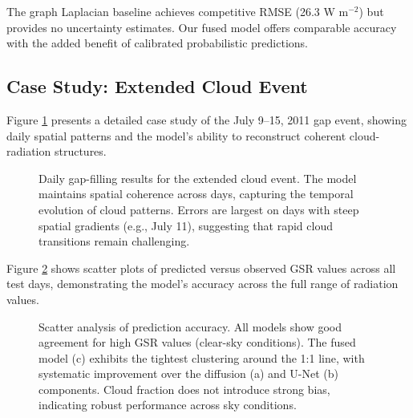 \documentclass[preprint,12pt]{elsarticle}
\begin{document}
The graph Laplacian baseline achieves competitive RMSE (26.3 W m$^{-2}$) but provides no uncertainty estimates. Our fused model offers comparable accuracy with the added benefit of calibrated probabilistic predictions.

\subsection{Case Study: Extended Cloud Event}

Figure \ref{fig:case_study} presents a detailed case study of the July 9--15, 2011 gap event, showing daily spatial patterns and the model's ability to reconstruct coherent cloud-radiation structures.

\begin{figure}[htbp]
\centering
{}
\caption{Daily gap-filling results for the extended cloud event. The model maintains spatial coherence across days, capturing the temporal evolution of cloud patterns. Errors are largest on days with steep spatial gradients (e.g., July 11), suggesting that rapid cloud transitions remain challenging.}
\label{fig:case_study}
\end{figure}

Figure \ref{fig:scatter} shows scatter plots of predicted versus observed GSR values across all test days, demonstrating the model's accuracy across the full range of radiation values.

\begin{figure}[htbp]
\centering
{}
\caption{Scatter analysis of prediction accuracy. All models show good agreement for high GSR values (clear-sky conditions). The fused model (c) exhibits the tightest clustering around the 1:1 line, with systematic improvement over the diffusion (a) and U-Net (b) components. Cloud fraction does not introduce strong bias, indicating robust performance across sky conditions.}
\label{fig:scatter}
\end{figure}
\end{document}
